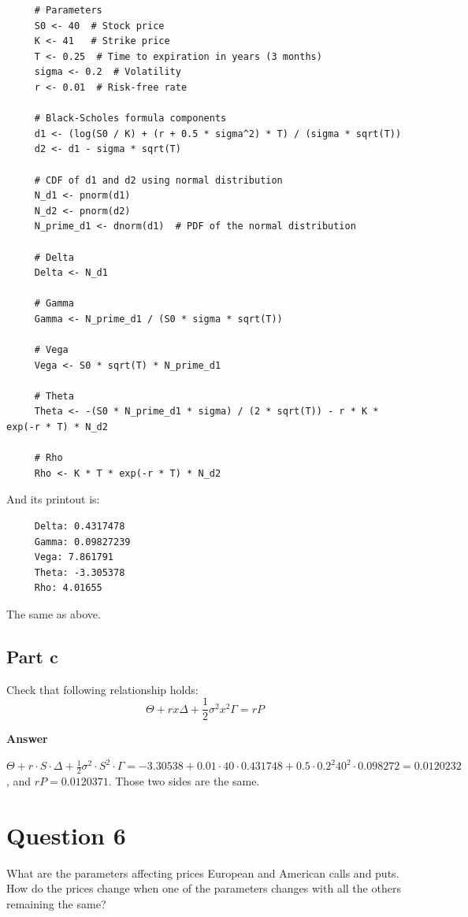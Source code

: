 \documentclass[letterpaper]{article}
\begin{document}
	\begin{lstlisting}
     # Parameters
     S0 <- 40  # Stock price
     K <- 41   # Strike price
     T <- 0.25  # Time to expiration in years (3 months)
     sigma <- 0.2  # Volatility
     r <- 0.01  # Risk-free rate
     
     # Black-Scholes formula components
     d1 <- (log(S0 / K) + (r + 0.5 * sigma^2) * T) / (sigma * sqrt(T))
     d2 <- d1 - sigma * sqrt(T)
     
     # CDF of d1 and d2 using normal distribution
     N_d1 <- pnorm(d1)
     N_d2 <- pnorm(d2)
     N_prime_d1 <- dnorm(d1)  # PDF of the normal distribution
     
     # Delta
     Delta <- N_d1
     
     # Gamma
     Gamma <- N_prime_d1 / (S0 * sigma * sqrt(T))
     
     # Vega
     Vega <- S0 * sqrt(T) * N_prime_d1
     
     # Theta
     Theta <- -(S0 * N_prime_d1 * sigma) / (2 * sqrt(T)) - r * K * exp(-r * T) * N_d2
     
     # Rho
     Rho <- K * T * exp(-r * T) * N_d2
	\end{lstlisting}

And its printout is: 

\begin{minipage}{\linewidth}
	\begin{Verbatim}
     Delta: 0.4317478 
     Gamma: 0.09827239 
     Vega: 7.861791 
     Theta: -3.305378 
     Rho: 4.01655 
	\end{Verbatim}
\end{minipage}

The same as above.
		
		\subsection{Part c}
		Check that following relationship holds:
		$$
		\Theta+r x \Delta+\frac{1}{2} \sigma^{2} x^{2} \Gamma=r P
		$$
		
		\textbf{Answer}
		
		$\Theta + r \cdot S \cdot \Delta + \frac{1}{2} \sigma^2 \cdot S^2 \cdot \Gamma=-3.30538+0.01\cdot40\cdot0.431748+0.5\cdot0.2^{2}40^{2}\cdot0.098272=0.0120232$, and $rP=0.0120371$.  Those two sides are the same. 
		
		\clearpage
		\section{Question 6}
		What are the parameters affecting prices European and American calls and puts. How do the prices change when one of the parameters changes with all the others remaining the same?
		
\end{document}
